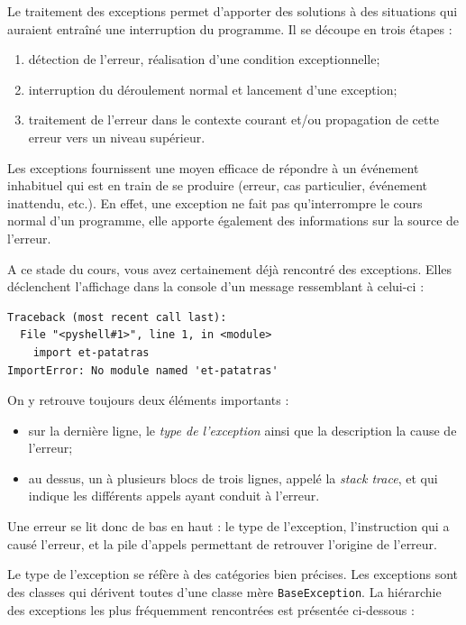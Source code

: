 \documentclass[12pt, a4paper]{article}
\begin{document}
Le traitement des exceptions permet d'apporter des solutions à des situations qui auraient entraîné une interruption du programme. Il se découpe en trois étapes :
\begin{enumerate}
	\item détection de l'erreur, réalisation d'une condition exceptionnelle;
	\item interruption du déroulement normal et lancement d'une exception;
	\item traitement de l'erreur dans le contexte courant et/ou propagation de cette erreur vers un niveau supérieur.
\end{enumerate}

Les exceptions fournissent une moyen efficace de répondre à un événement inhabituel qui est en train de se produire (erreur, cas particulier, événement inattendu, etc.). En effet, une exception ne fait pas qu'interrompre le cours normal d'un programme, elle apporte également des informations sur la source de l'erreur. 

A ce stade du cours, vous avez certainement déjà rencontré des exceptions. Elles déclenchent l'affichage dans la console d'un message ressemblant à celui-ci :
\begin{lstlisting}
Traceback (most recent call last):
  File "<pyshell#1>", line 1, in <module>
    import et-patatras
ImportError: No module named 'et-patatras'
\end{lstlisting}

On y retrouve toujours deux éléments importants :
\begin{itemize}
	\item sur la dernière ligne, le \textit{type de l'exception} ainsi que la description la cause de l'erreur;
	\item au dessus, un à plusieurs blocs de trois lignes, appelé la \textit{stack trace}, et qui indique les différents appels ayant conduit à l'erreur.
\end{itemize}

Une erreur se lit donc de bas en haut : le type de l'exception, l'instruction qui a causé l'erreur, et la pile d'appels permettant de retrouver l'origine de l'erreur.

Le type de l'exception se réfère à des catégories bien précises. Les exceptions sont des classes qui dérivent toutes d'une classe mère \lstinline{BaseException}. La hiérarchie des exceptions les plus fréquemment rencontrées est présentée ci-dessous :
\end{document}
